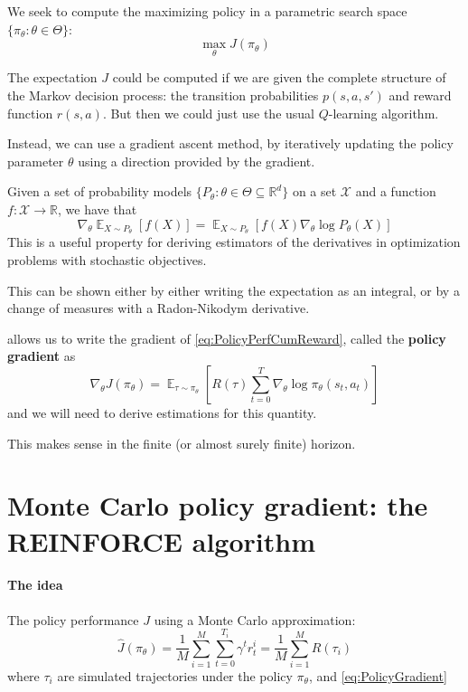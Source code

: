 \documentclass[12pt]{report}
\newcommand\RR{\mathbb{R}}
\DeclareMathOperator{\EE}{\mathbb{E}}
\newcommand{\calX}{\mathcal{X}}
\newcommand{\bluefont}{\color{Blue}}
\begin{document}
We seek to compute the maximizing policy in a parametric search space $\{\pi_\theta: \theta\in\Theta\}$:
\[
	\max_\theta J(\pi_\theta)
\]

The expectation $J$ could be computed if we are given the complete structure of the Markov decision process: the transition probabilities $p(s,a,s')$ and reward function $r(s,a)$. But then we could just use the usual $Q$-learning algorithm.

Instead, we can use a gradient ascent method, by iteratively updating the policy parameter $\theta$ using a direction provided by the gradient.

\begin{prop}\label{prop:parametricGradient}
	Given a set of probability models $\{P_\theta: \theta\in\Theta\subseteq \RR^d\}$ on a set $\calX$ and a function $f\colon \calX\to \RR$, we have that
	\[
	\nabla_\theta \EE_{X\sim P_\theta}[f(X)]
	= \EE_{X\sim P_\theta}[f(X)\nabla_\theta \log P_\theta(X)]
	\]
	This is a useful property for deriving estimators of the derivatives in optimization problems with stochastic objectives.
\end{prop}

This can be shown either by either writing the expectation as an integral, or by a change of measures with a Radon-Nikodym derivative.

 allows us to write the gradient of \eqref{eq:PolicyPerfCumReward}, called the \textbf{\bluefont policy gradient} as
\begin{equation}\label{eq:PolicyGradient}
	\nabla_\theta J(\pi_\theta) =
	\EE_{\tau\sim\pi_\theta}\left[
	R(\tau)\sum_{t=0}^T\nabla_\theta \log\pi_\theta(s_t, a_t)
	\right]
\end{equation}
and we will need to derive estimations for this quantity.

This makes sense in the finite (or almost surely finite) horizon.


\section{Monte Carlo policy gradient: the REINFORCE algorithm}

\paragraph{The idea} The policy performance $J$ using a Monte Carlo approximation:
\begin{equation}\label{eq:MCCumReward}
	\widehat{J}(\pi_\theta) = \frac{1}{M}
	\sum_{i=1}^{M}\sum_{t=0}^{T_i} \gamma^t r^i_t =
	\frac{1}{M}\sum_{i=1}^M R(\tau_i)
\end{equation}
where $\tau_i$ are simulated trajectories under the policy $\pi_\theta$, and \cref{eq:PolicyGradient} 
\end{document}
